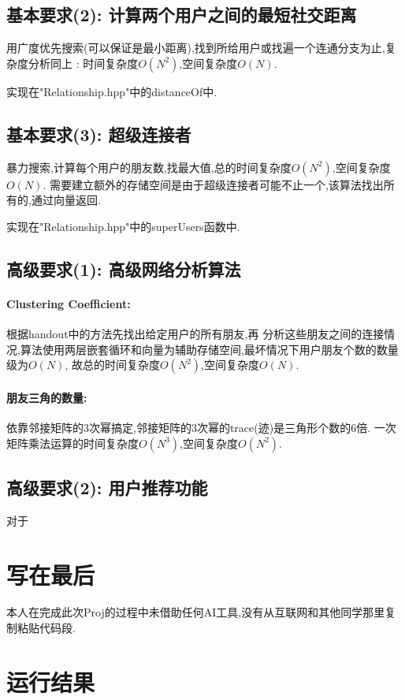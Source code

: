\documentclass{article}
\begin{document}
\begin{CJK*}{UTF8}{gbsn}
\subsection{基本要求(2): 计算两个用户之间的最短社交距离}
\par 用广度优先搜索(可以保证是最小距离),找到所给用户或找遍一个连通分支为止,复杂度分析同上
: 时间复杂度$O(N^2)$,空间复杂度$O(N)$.
\par 实现在"Relationship.hpp"中的distanceOf中.
\subsection{基本要求(3): 超级连接者}
\par 暴力搜索,计算每个用户的朋友数,找最大值,总的时间复杂度$O(N^2)$,空间复杂度$O(N)$.
需要建立额外的存储空间是由于超级连接者可能不止一个,该算法找出所有的,通过向量返回.
\par 实现在"Relationship.hpp"中的superUsers函数中.
\subsection{高级要求(1): 高级网络分析算法}
\paragraph{Clustering Coefficient: } 根据handout中的方法先找出给定用户的所有朋友,再
分析这些朋友之间的连接情况,算法使用两层嵌套循环和向量为辅助存储空间,最坏情况下用户朋友个数的数量级为$O(N)$,
故总的时间复杂度$O(N^2)$,空间复杂度$O(N)$.
\paragraph{朋友三角的数量: }依靠邻接矩阵的3次幂搞定,邻接矩阵的3次幂的trace(迹)是三角形个数的6倍.
一次矩阵乘法运算的时间复杂度$O(N^3)$,空间复杂度$O(N^2)$.
\subsection{高级要求(2): 用户推荐功能}
\par 对于

\section{写在最后}
\par 本人在完成此次Proj的过程中未借助任何AI工具,没有从互联网和其他同学那里复制粘贴代码段.

\section{运行结果}

\end{CJK*}
\end{document}

